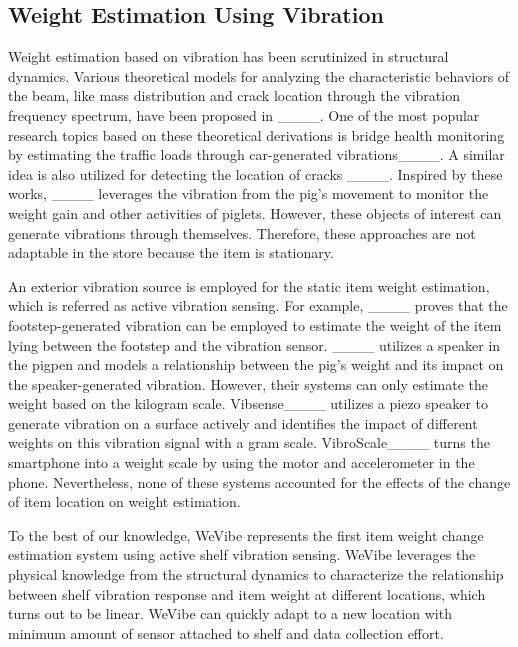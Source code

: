 \subsection{Weight Estimation Using Vibration}
Weight estimation based on vibration has been scrutinized in structural dynamics. Various theoretical models for analyzing the characteristic behaviors of the beam, like mass distribution and crack location through the vibration frequency spectrum, have been proposed in ____. One of the most popular research topics based on these theoretical derivations is bridge health monitoring by estimating the traffic loads through car-generated vibrations____. A similar idea is also utilized for detecting the location of cracks ____. Inspired by these works, ____ leverages the vibration from the pig's movement to monitor the weight gain and other activities of piglets. However, these objects of interest can generate vibrations through themselves. Therefore, these approaches are not adaptable in the store because the item is stationary.

An exterior vibration source is employed for the static item weight estimation, which is referred as active vibration sensing. For example, ____ proves that the footstep-generated vibration can be employed to estimate the weight of the item lying between the footstep and the vibration sensor. ____ utilizes a speaker in the pigpen and models a relationship between the pig's weight and its impact on the speaker-generated vibration. However, their systems can only estimate the weight based on the kilogram scale. Vibsense____ utilizes a piezo speaker to generate vibration on a surface actively and identifies the impact of different weights on this vibration signal with a gram scale. VibroScale____ turns the smartphone into a weight scale by using the motor and accelerometer in the phone. Nevertheless, none of these systems accounted for the effects of the change of item location on weight estimation. 

To the best of our knowledge, WeVibe represents the first item weight change estimation system using active shelf vibration sensing. WeVibe leverages the physical knowledge from the structural dynamics to characterize the relationship between shelf vibration response and item weight at different locations, which turns out to be linear. WeVibe can quickly adapt to a new location with minimum amount of sensor attached to shelf and data collection effort.